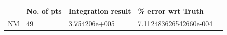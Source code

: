 \documentclass[landscape]{slides}
\begin{document}
\begin{slide}
  \begin{tabular}{ | l | l | l | l | l | }
    \hline
                  					&   No. of pts			& Integration result 			  & \% error wrt Truth			 \\ \hline 
      NM          					&   49       			  & 3.754206e+005          & 7.112483626542660e-004   \\
      \hline
  \end{tabular}
   	\end{slide}
\end{document}
